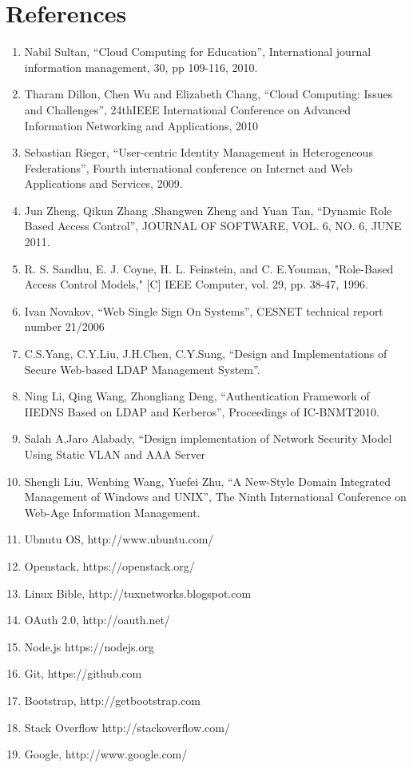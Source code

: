 \documentclass[12pt]{report}
\begin{document}
\section{References}

\begin{enumerate}
\item Nabil Sultan, ``Cloud Computing for Education”, International journal information management, 30, pp 109-116, 2010.
\item Tharam Dillon, Chen Wu and Elizabeth Chang, ``Cloud Computing: Issues and Challenges'',  24thIEEE International Conference on Advanced Information Networking and Applications, 2010 
\item Sebastian Rieger, ``User-centric Identity Management in Heterogeneous Federations'', Fourth international conference on Internet and Web Applications and Services, 2009.
\item Jun Zheng, Qikun Zhang ,Shangwen Zheng and Yuan Tan, ``Dynamic Role Based Access Control'',  JOURNAL OF SOFTWARE, VOL. 6, NO. 6, JUNE 2011.
\item R. S. Sandhu, E. J. Coyne, H. L. Feinstein, and C. E.Youman, "Role-Based Access Control Models," [C] IEEE Computer, vol. 29, pp. 38-47, 1996.
\item Ivan Novakov, ``Web Single Sign On Systems'', CESNET technical report number 21/2006
\item C.S.Yang, C.Y.Liu, J.H.Chen, C.Y.Sung, ``Design and Implementations of Secure Web-based LDAP Management System''.
\item Ning Li, Qing Wang, Zhongliang Deng, ``Authentication Framework of IIEDNS Based on LDAP and Kerberos'', Proceedings of IC-BNMT2010.
\item Salah A.Jaro Alabady, ``Design implementation of Network Security Model Using Static VLAN and AAA Server
\item Shengli Liu, Wenbing Wang, Yuefei Zhu, ``A New-Style Domain Integrated Management of Windows and UNIX'', The Ninth International Conference on Web-Age Information Management.
\item Ubnutu OS, http://www.ubuntu.com/
\item Openstack, https://openstack.org/
\item Linux Bible, http://tuxnetworks.blogspot.com
\item OAuth 2.0, http://oauth.net/
\item Node.js https://nodejs.org
\item Git, https://github.com
\item Bootstrap, http://getbootstrap.com 
\item Stack Overflow http://stackoverflow.com/
\item Google, http://www.google.com/
\end{enumerate}
\end{document}
